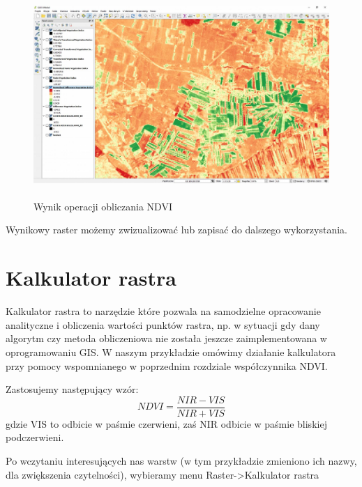 \documentclass[12pt,a4paper]{book}
\begin{document}
\begin{center}
\begin{figure}
\includegraphics[width=13cm,height=7.786cm]{004-saga-grafika.jpg}
\caption{Wynik operacji obliczania NDVI}
\end{figure}
\end{center}
Wynikowy raster możemy zwizualizować lub zapisać do dalszego wykorzystania.

\section[Kalkulator rastra]{Kalkulator rastra}
Kalkulator rastra to narzędzie które pozwala na samodzielne opracowanie analityczne i obliczenia wartości punktów rastra, np. w sytuacji gdy dany algorytm czy metoda obliczeniowa nie została jeszcze zaimplementowana w oprogramowaniu GIS. W naszym przykładzie omówimy działanie kalkulatora przy pomocy wspomnianego w poprzednim rozdziale współczynnika NDVI.

Zastosujemy następujący wzór:
\begin{equation}
NDVI = \frac{NIR-VIS}{NIR+VIS}
\end{equation}
gdzie VIS to odbicie w paśmie czerwieni, zaś NIR odbicie w paśmie bliskiej podczerwieni.

Po wczytaniu interesujących nas warstw (w tym przykładzie zmieniono ich nazwy, dla zwiększenia czytelności), wybieramy menu  Raster-{\textgreater}Kalkulator rastra 
\end{document}
